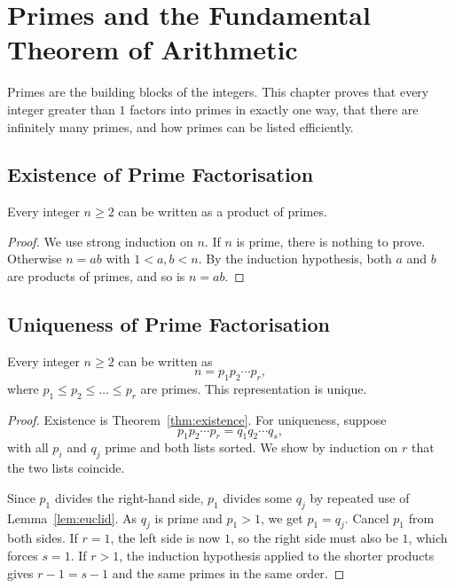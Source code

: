 \chapter{Primes and the Fundamental Theorem of Arithmetic}\label{ch:primes}

Primes are the building blocks of the integers. This chapter proves that every integer greater than $1$ factors into primes in exactly one way, that there are infinitely many primes, and how primes can be listed efficiently.

\section{Existence of Prime Factorisation}

\begin{theorem}\label{thm:existence}
Every integer $n\ge 2$ can be written as a product of primes.
\end{theorem}

\begin{proof}
We use strong induction on $n$. If $n$ is prime, there is nothing to prove. Otherwise $n=ab$ with $1<a,b<n$. By the induction hypothesis, both $a$ and $b$ are products of primes, and so is $n=ab$.
\end{proof}

\section{Uniqueness of Prime Factorisation}

\begin{theorem}\label{thm:fta}
Every integer $n\ge 2$ can be written as
\[
  n = p_1 p_2 \cdots p_r,
\]
where $p_1\le p_2\le\dots\le p_r$ are primes. This representation is unique.
\end{theorem}

\begin{proof}
Existence is Theorem~\ref{thm:existence}. For uniqueness, suppose
\[
  p_1 p_2\cdots p_r = q_1 q_2\cdots q_s,
\]
with all $p_i$ and $q_j$ prime and both lists sorted. We show by induction on $r$ that the two lists coincide.

Since $p_1$ divides the right-hand side, $p_1$ divides some $q_j$ by repeated use of Lemma~\ref{lem:euclid}. As $q_j$ is prime and $p_1>1$, we get $p_1=q_j$. Cancel $p_1$ from both sides. If $r=1$, the left side is now $1$, so the right side must also be $1$, which forces $s=1$. If $r>1$, the induction hypothesis applied to the shorter products gives $r-1=s-1$ and the same primes in the same order.
\end{proof}

